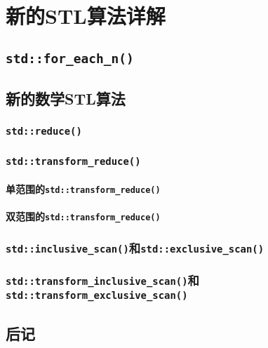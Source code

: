 \chapter{新的STL算法详解}\label{ch23}


\section{\texttt{std::for\_each\_n()}}


\section{新的数学STL算法}

\subsection{\texttt{std::reduce()}}\label{ch23.2.1}

\subsection{\texttt{std::transform\_reduce()}}\label{ch23.2.2}

\subsubsection{单范围的\texttt{std::transform\_reduce()}}

\subsubsection{双范围的\texttt{std::transform\_reduce()}}\label{ch23.2.2.2}

\subsection{\texttt{std::inclusive\_scan()}和\texttt{std::exclusive\_scan()}}\label{ch23.2.3}

\subsection{\texorpdfstring{\texttt{std::transform\_inclusive\_scan()}和\\
\texttt{std::transform\_exclusive\_scan()}}{}}


\section{后记}